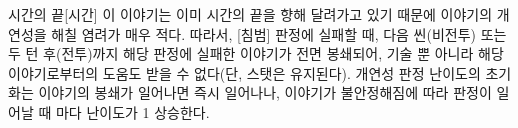 \documentclass{report}
\begin{document}
	\begin{story}{시간의 끝}{[시간]}
		이 이야기는 이미 시간의 끝을 향해 달려가고 있기 때문에 이야기의 개연성을 해칠 염려가 매우 적다. 따라서, [침범] 판정에 실패할 때, 다음 씬(비전투) 또는 두 턴 후(전투)까지 해당 판정에 실패한 이야기가 전면 봉쇄되어, 기술 뿐 아니라 해당 이야기로부터의 도움도 받을 수 없다(단, 스탯은 유지된다). 개연성 판정 난이도의 초기화는 이야기의 봉쇄가 일어나면 즉시 일어나나, 이야기가 불안정해짐에 따라 판정이 일어날 때 마다 난이도가 1 상승한다.
	\end{story}
\end{document}
